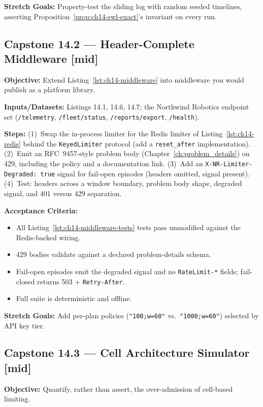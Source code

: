 \textbf{Stretch Goals:} Property-test the sliding log with random seeded
timelines, asserting Proposition~\ref{prop:ch14-swl-exact}'s invariant on
every run.

\subsection*{Capstone 14.2 --- Header-Complete Middleware \hfill [mid]}
\textbf{Objective:} Extend Listing~\ref{lst:ch14-middleware} into middleware
you would publish as a platform library.

\textbf{Inputs/Datasets:} Listings 14.1, 14.6, 14.7; the Northwind Robotics
endpoint set (\texttt{/telemetry}, \texttt{/fleet/status},
\texttt{/reports/export}, \texttt{/health}).

\textbf{Steps:} (1)~Swap the in-process limiter for the Redis limiter of
Listing~\ref{lst:ch14-redis} behind the \texttt{KeyedLimiter} protocol
(add a \texttt{reset\_after} implementation). (2)~Emit an RFC~9457-style
problem body (Chapter~\ref{ch:problem_details}) on 429, including the
policy and a documentation link. (3)~Add an \texttt{X-NR-Limiter-Degraded:
true} signal for fail-open episodes (headers omitted, signal present).
(4)~Test: headers across a window boundary, problem body shape, degraded
signal, and 401 versus 429 separation.

\textbf{Acceptance Criteria:}
\begin{itemize}
  \item[$\square$] All Listing~\ref{lst:ch14-middleware-tests} tests pass
        unmodified against the Redis-backed wiring.
  \item[$\square$] 429 bodies validate against a declared problem-details
        schema.
  \item[$\square$] Fail-open episodes emit the degraded signal and no
        \texttt{RateLimit-*} fields; fail-closed returns 503 +
        \texttt{Retry-After}.
  \item[$\square$] Full suite is deterministic and offline.
\end{itemize}

\textbf{Stretch Goals:} Add per-plan policies (\texttt{"100;w=60"} vs.\
\texttt{"1000;w=60"}) selected by API key tier.

\subsection*{Capstone 14.3 --- Cell Architecture Simulator \hfill [mid]}
\textbf{Objective:} Quantify, rather than assert, the over-admission of
cell-based limiting.

